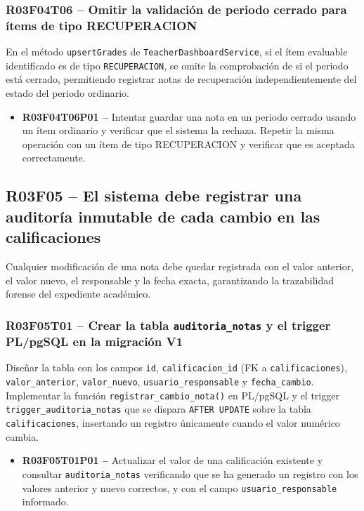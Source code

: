\documentclass[12pt, a4paper]{report}
\begin{document}
\subsubsection{R03F04T06 -- Omitir la validación de periodo cerrado para ítems de tipo RECUPERACION}
En el método \texttt{upsertGrades} de \texttt{TeacherDashboardService}, si el ítem evaluable identificado es de tipo \texttt{RECUPERACION}, se omite la comprobación de si el periodo está cerrado, permitiendo registrar notas de recuperación independientemente del estado del periodo ordinario.
\begin{itemize}
  \item \textbf{R03F04T06P01 --} Intentar guardar una nota en un periodo cerrado usando un ítem ordinario y verificar que el sistema la rechaza. Repetir la misma operación con un ítem de tipo RECUPERACION y verificar que es aceptada correctamente.
\end{itemize}

\subsection{R03F05 -- El sistema debe registrar una auditoría inmutable de cada cambio en las calificaciones}

Cualquier modificación de una nota debe quedar registrada con el valor anterior, el valor nuevo, el responsable y la fecha exacta, garantizando la trazabilidad forense del expediente académico.

\subsubsection{R03F05T01 -- Crear la tabla \texttt{auditoria\_notas} y el trigger PL/pgSQL en la migración V1}
Diseñar la tabla con los campos \texttt{id}, \texttt{calificacion\_id} (FK a \texttt{calificaciones}), \texttt{valor\_anterior}, \texttt{valor\_nuevo}, \texttt{usuario\_responsable} y \texttt{fecha\_cambio}. Implementar la función \texttt{registrar\_cambio\_nota()} en PL/pgSQL y el trigger \texttt{trigger\_auditoria\_notas} que se dispara \texttt{AFTER UPDATE} sobre la tabla \texttt{calificaciones}, insertando un registro únicamente cuando el valor numérico cambia.
\begin{itemize}
  \item \textbf{R03F05T01P01 --} Actualizar el valor de una calificación existente y consultar \texttt{auditoria\_notas} verificando que se ha generado un registro con los valores anterior y nuevo correctos, y con el campo \texttt{usuario\_responsable} informado.
\end{itemize}
\end{document}
